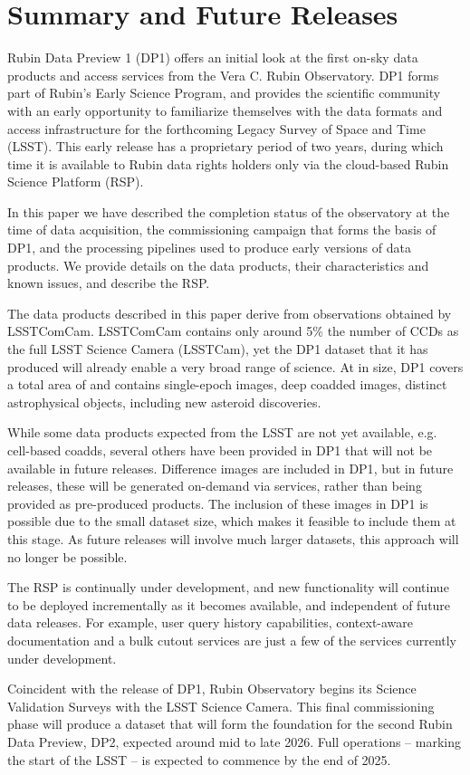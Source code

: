 \section{Summary and Future Releases
\label{sec:summary}}

Rubin Data Preview 1 (\gls{DP1}) offers an initial look at the first on-sky data products and access services from the Vera C. Rubin Observatory. \gls{DP1} forms part of Rubin's Early Science Program, and provides the scientific community with an early opportunity to familiarize themselves with the data formats and access infrastructure for the forthcoming Legacy Survey of Space and Time (LSST).
This early release has a proprietary period of two years, during which time it is  available to Rubin data rights holders only via the cloud-based Rubin Science Platform (\gls{RSP}).

In this paper we have described the completion status of the observatory at the time of data acquisition, the commissioning campaign that forms the basis of \gls{DP1}, and the processing pipelines used to produce early versions of data products.
We provide details on the data products, their characteristics and
known issues, and describe the \gls{RSP}.

The data products described in this paper derive from observations obtained by \gls{LSSTComCam}. \gls{LSSTComCam} contains only around 5\% the number of CCDs as the full LSST Science Camera (LSSTCam), yet the DP1 dataset that it has produced will already enable a very broad range of science.
At \sizeinbytes in size, DP1 covers a total area of \totalarea and contains \nexposures single-\gls{epoch} images, \ndeepcoadds deep coadded images, \nobjects distinct astrophysical objects, including  \nnewasteroiddiscoveries  new asteroid discoveries.

While some data products expected from the LSST are not yet available, e.g. cell-based coadds, several others have been provided in \gls{DP1} that will not be available in future releases.
Difference images are included in \gls{DP1}, but in future releases, these will be generated on-demand via services, rather than being provided as pre-produced products.
The inclusion of these images in \gls{DP1} is possible due to the small dataset size, which makes it feasible to include them at this stage.
As future releases will involve much larger datasets, this approach will no longer be possible.

The \gls{RSP} is continually under development, and new functionality will continue to be deployed incrementally as it becomes available, and independent of future data releases.
For example, user query history capabilities, context-aware documentation and a bulk cutout services are just a few of the services currently under development.

Coincident with the release of DP1, Rubin Observatory begins its Science Validation Surveys with the LSST Science Camera.
This final commissioning phase will produce a dataset that will form the foundation for the second Rubin Data Preview, \gls{DP2}, expected around mid to late 2026.
Full operations -- marking the start of the \gls{LSST} -- is expected to commence by the end of 2025.
